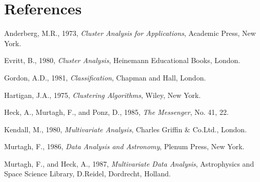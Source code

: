 \section{References}
\begin{refs}
\item Anderberg, M.R., 1973, {\it Cluster Analysis for Applications},
  Academic Press, New York.
\item Evritt, B., 1980, {\it Cluster Analysis}, Heinemann Educational Books,
  London.
\item Gordon, A.D., 1981, {\it Classification}, Chapman and Hall, London.
\item Hartigan, J.A., 1975, {\it Clustering Algorithms}, Wiley, New York.
\item Heck, A., Murtagh, F., and Ponz, D., 1985, {\it The Messenger},
  No. 41, 22.
\item Kendall, M., 1980, {\it Multivariate Analysis}, Charles Griffin \&
  Co.Ltd., London.
\item Murtagh, F., 1986, {\it Data Analysis and Astronomy}, Plenum Press,
  New York.
\item Murtagh, F., and Heck, A., 1987, {\it Multivariate Data Analysis},
  Astrophysics and Space Science Library, D.Reidel, Dordrecht, Holland.
\end{refs}

